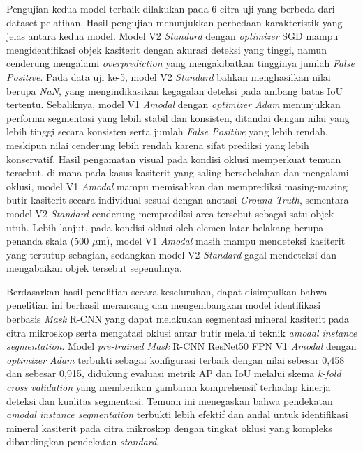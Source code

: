 \begin{center}
	Pengujian kedua model terbaik dilakukan pada 6 citra uji yang berbeda dari dataset pelatihan. Hasil pengujian menunjukkan perbedaan karakteristik yang jelas antara kedua model. Model V2 \textit{Standard} dengan \textit{optimizer} SGD mampu mengidentifikasi objek kasiterit dengan akurasi deteksi yang tinggi, namun cenderung mengalami \textit{overprediction} yang mengakibatkan tingginya jumlah \textit{False Positive}. Pada data uji ke-5, model V2 \textit{Standard} bahkan menghasilkan nilai \IoUrangefiftyy berupa \textit{NaN}, yang mengindikasikan kegagalan deteksi pada ambang batas IoU tertentu. Sebaliknya, model V1 \textit{Amodal} dengan \textit{optimizer Adam} menunjukkan performa segmentasi yang lebih stabil dan konsisten, ditandai dengan nilai \IoUrangefiftyy yang lebih tinggi secara konsisten serta jumlah \textit{False Positive} yang lebih rendah, meskipun nilai \APrangefiftyy cenderung lebih rendah karena sifat prediksi yang lebih konservatif. Hasil pengamatan visual pada kondisi oklusi memperkuat temuan tersebut, di mana pada kasus kasiterit yang saling bersebelahan dan mengalami oklusi, model V1 \textit{Amodal} mampu memisahkan dan memprediksi masing-masing butir kasiterit secara individual sesuai dengan anotasi \textit{Ground Truth}, sementara model V2 \textit{Standard} cenderung memprediksi area tersebut sebagai satu objek utuh. Lebih lanjut, pada kondisi oklusi oleh elemen latar belakang berupa penanda skala (500 $\mu$m), model V1 \textit{Amodal} masih mampu mendeteksi kasiterit yang tertutup sebagian, sedangkan model V2 \textit{Standard} gagal mendeteksi dan mengabaikan objek tersebut sepenuhnya. \par

	Berdasarkan hasil penelitian secara keseluruhan, dapat disimpulkan bahwa penelitian ini berhasil merancang dan mengembangkan model identifikasi berbasis \textit{Mask} R-CNN yang dapat melakukan segmentasi mineral kasiterit pada citra mikroskop serta mengatasi oklusi antar butir melalui teknik \textit{amodal instance segmentation}. Model \textit{pre-trained Mask} R-CNN ResNet50 FPN V1 \textit{Amodal} dengan \textit{optimizer Adam} terbukti sebagai konfigurasi terbaik dengan nilai \APrangefiftyy sebesar 0{,}458 dan \IoUrangefiftyy sebesar 0{,}915, didukung evaluasi metrik AP dan IoU melalui skema \textit{k-fold cross validation} yang memberikan gambaran komprehensif terhadap kinerja deteksi dan kualitas segmentasi. Temuan ini menegaskan bahwa pendekatan \textit{amodal instance segmentation} terbukti lebih efektif dan andal untuk identifikasi mineral kasiterit pada citra mikroskop dengan tingkat oklusi yang kompleks dibandingkan pendekatan \textit{standard}. \par


\end{center}
